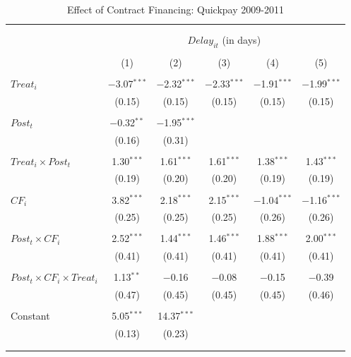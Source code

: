 \documentclass[
]{article}
\begin{document}
\begin{table}[H] \centering 
  \caption{Effect of Contract Financing: Quickpay 2009-2011} 
  \label{} 
\small 
\begin{tabular}{@{\extracolsep{-2pt}}lccccc} 
\\[-1.8ex]\hline 
\hline \\[-1.8ex] 
\\[-1.8ex] & \multicolumn{5}{c}{$Delay_{it}$ (in days)} \\ 
\\[-1.8ex] & (1) & (2) & (3) & (4) & (5)\\ 
\hline \\[-1.8ex] 
 $Treat_i$ & $-$3.07$^{***}$ & $-$2.32$^{***}$ & $-$2.33$^{***}$ & $-$1.91$^{***}$ & $-$1.99$^{***}$ \\ 
  & (0.15) & (0.15) & (0.15) & (0.15) & (0.15) \\ 
  & & & & & \\ 
 $Post_t$ & $-$0.32$^{**}$ & $-$1.95$^{***}$ &  &  &  \\ 
  & (0.16) & (0.31) &  &  &  \\ 
  & & & & & \\ 
 $Treat_i \times Post_t$ & 1.30$^{***}$ & 1.61$^{***}$ & 1.61$^{***}$ & 1.38$^{***}$ & 1.43$^{***}$ \\ 
  & (0.19) & (0.20) & (0.20) & (0.19) & (0.19) \\ 
  & & & & & \\ 
 $CF_i$ & 3.82$^{***}$ & 2.18$^{***}$ & 2.15$^{***}$ & $-$1.04$^{***}$ & $-$1.16$^{***}$ \\ 
  & (0.25) & (0.25) & (0.25) & (0.26) & (0.26) \\ 
  & & & & & \\ 
 $Post_t \times CF_i$ & 2.52$^{***}$ & 1.44$^{***}$ & 1.46$^{***}$ & 1.88$^{***}$ & 2.00$^{***}$ \\ 
  & (0.41) & (0.41) & (0.41) & (0.41) & (0.41) \\ 
  & & & & & \\ 
 $Post_t \times CF_i \times Treat_i$ & 1.13$^{**}$ & $-$0.16 & $-$0.08 & $-$0.15 & $-$0.39 \\ 
  & (0.47) & (0.45) & (0.45) & (0.45) & (0.46) \\ 
  & & & & & \\ 
 Constant & 5.05$^{***}$ & 14.37$^{***}$ &  &  &  \\ 
  & (0.13) & (0.23) &  &  &  \\ 
  & & & & & \\ 
\hline \\[-1.8ex] 

\end{tabular}
\end{table}
\end{document}
